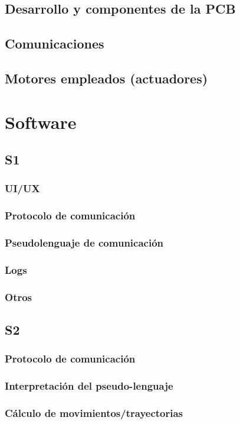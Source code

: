 \subsection{Desarrollo y componentes de la PCB}
\subsection{Comunicaciones}
\subsection{Motores empleados (actuadores)}
\section{Software}
\subsection{S1}
\subsubsection{UI/UX}
\subsubsection{Protocolo de comunicación}
\subsubsection{Pseudolenguaje de comunicación}
\subsubsection{Logs}
\subsubsection{Otros}
\subsection{S2}
\subsubsection{Protocolo de comunicación}
\subsubsection{Interpretación del pseudo-lenguaje}
\subsubsection{Cálculo de movimientos/trayectorias}
